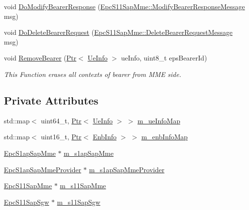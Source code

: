 \begin{DoxyCompactItemize}
\item 
void \hyperlink{classns3_1_1EpcMmeApplication_a623fb0bd41d2ec4b1c7f373578196385}{Do\+Modify\+Bearer\+Response} (\hyperlink{structns3_1_1EpcS11SapMme_1_1ModifyBearerResponseMessage}{Epc\+S11\+Sap\+Mme\+::\+Modify\+Bearer\+Response\+Message} msg)
\item 
void \hyperlink{classns3_1_1EpcMmeApplication_ab6e174a5b089febcf43e53bace051d41}{Do\+Delete\+Bearer\+Request} (\hyperlink{structns3_1_1EpcS11SapMme_1_1DeleteBearerRequestMessage}{Epc\+S11\+Sap\+Mme\+::\+Delete\+Bearer\+Request\+Message} msg)
\item 
void \hyperlink{classns3_1_1EpcMmeApplication_a8e7a44a4ccafd5d94811ddf265f71466}{Remove\+Bearer} (\hyperlink{classns3_1_1Ptr}{Ptr}$<$ \hyperlink{structns3_1_1EpcMmeApplication_1_1UeInfo}{Ue\+Info} $>$ ue\+Info, uint8\+\_\+t eps\+Bearer\+Id)
\begin{DoxyCompactList}\small\item\em This Function erases all contexts of bearer from M\+ME side. \end{DoxyCompactList}\end{DoxyCompactItemize}
\subsection*{Private Attributes}
\begin{DoxyCompactItemize}
\item 
std\+::map$<$ uint64\+\_\+t, \hyperlink{classns3_1_1Ptr}{Ptr}$<$ \hyperlink{structns3_1_1EpcMmeApplication_1_1UeInfo}{Ue\+Info} $>$ $>$ \hyperlink{classns3_1_1EpcMmeApplication_a1f33ca8847355e961f6c290dfb6e16e6}{m\+\_\+ue\+Info\+Map}
\item 
std\+::map$<$ uint16\+\_\+t, \hyperlink{classns3_1_1Ptr}{Ptr}$<$ \hyperlink{structns3_1_1EpcMmeApplication_1_1EnbInfo}{Enb\+Info} $>$ $>$ \hyperlink{classns3_1_1EpcMmeApplication_a6c49c825306fc4923aef0352a1fab029}{m\+\_\+enb\+Info\+Map}
\item 
\hyperlink{classns3_1_1EpcS1apSapMme}{Epc\+S1ap\+Sap\+Mme} $\ast$ \hyperlink{classns3_1_1EpcMmeApplication_a231d8125b154eecf240b5626d08a93ec}{m\+\_\+s1ap\+Sap\+Mme}
\item 
\hyperlink{classns3_1_1EpcS1apSapMmeProvider}{Epc\+S1ap\+Sap\+Mme\+Provider} $\ast$ \hyperlink{classns3_1_1EpcMmeApplication_a22aa4b3242125c65e94ce651970be4c1}{m\+\_\+s1ap\+Sap\+Mme\+Provider}
\item 
\hyperlink{classns3_1_1EpcS11SapMme}{Epc\+S11\+Sap\+Mme} $\ast$ \hyperlink{classns3_1_1EpcMmeApplication_a18a6d18b72bd10dd567eeffbb86e07ee}{m\+\_\+s11\+Sap\+Mme}
\item 
\hyperlink{classns3_1_1EpcS11SapSgw}{Epc\+S11\+Sap\+Sgw} $\ast$ \hyperlink{classns3_1_1EpcMmeApplication_a00c06da2169cc043ac1fa7bdd03b4027}{m\+\_\+s11\+Sap\+Sgw}
\end{DoxyCompactItemize}
